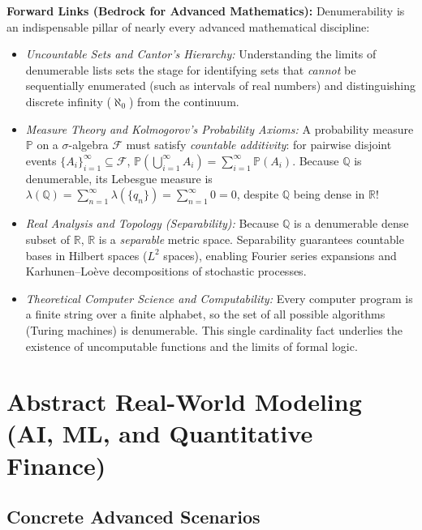 \documentclass[11pt, letterpaper]{article}
\theoremstyle{definition}
\theoremstyle{remark}
\begin{document}
\textbf{Forward Links (Bedrock for Advanced Mathematics):}
Denumerability is an indispensable pillar of nearly every advanced mathematical discipline:
\begin{itemize}
    \item \emph{Uncountable Sets and Cantor's Hierarchy:} Understanding the limits of denumerable lists sets the stage for identifying sets that \emph{cannot} be sequentially enumerated (such as intervals of real numbers) and distinguishing discrete infinity ($\aleph_0$) from the continuum.
    \item \emph{Measure Theory and Kolmogorov's Probability Axioms:} A probability measure $\mathbb{P}$ on a $\sigma$-algebra $\mathcal{F}$ must satisfy \emph{countable additivity}: for pairwise disjoint events $\{A_i\}_{i=1}^{\infty} \subseteq \mathcal{F}$, $\mathbb{P}\left(\bigcup_{i=1}^{\infty} A_i\right) = \sum_{i=1}^{\infty} \mathbb{P}(A_i)$. Because $\mathbb{Q}$ is denumerable, its Lebesgue measure is $\lambda(\mathbb{Q}) = \sum_{n=1}^{\infty} \lambda(\{q_n\}) = \sum_{n=1}^{\infty} 0 = 0$, despite $\mathbb{Q}$ being dense in $\mathbb{R}$!
    \item \emph{Real Analysis and Topology (Separability):} Because $\mathbb{Q}$ is a denumerable dense subset of $\mathbb{R}$, $\mathbb{R}$ is a \emph{separable} metric space. Separability guarantees countable bases in Hilbert spaces ($L^2$ spaces), enabling Fourier series expansions and Karhunen--Lo\`eve decompositions of stochastic processes.
    \item \emph{Theoretical Computer Science and Computability:} Every computer program is a finite string over a finite alphabet, so the set of all possible algorithms (Turing machines) is denumerable. This single cardinality fact underlies the existence of uncomputable functions and the limits of formal logic.
\end{itemize}

\section{Abstract Real-World Modeling (AI, ML, and Quantitative Finance)}

\subsection{Concrete Advanced Scenarios}
\end{document}
